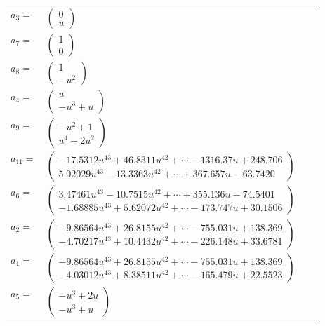 \documentclass[1p]{elsarticle_modified}
\theoremstyle{definition}
\begin{document}
\begin{tabular}{m{7pt} m{180pt} m{7pt} m{180pt} }
\flushright $a_{3}=$&$\begin{pmatrix}0\\u\end{pmatrix}$ \\
\flushright $a_{7}=$&$\begin{pmatrix}1\\0\end{pmatrix}$ \\
\flushright $a_{8}=$&$\begin{pmatrix}1\\- u^2\end{pmatrix}$ \\
\flushright $a_{4}=$&$\begin{pmatrix}u\\- u^3+u\end{pmatrix}$ \\
\flushright $a_{9}=$&$\begin{pmatrix}- u^2+1\\u^4-2 u^2\end{pmatrix}$ \\
\flushright $a_{11}=$&$\begin{pmatrix}-17.5312 u^{43}+46.8311 u^{42}+\cdots-1316.37 u+248.706\\5.02029 u^{43}-13.3363 u^{42}+\cdots+367.657 u-63.7420\end{pmatrix}$ \\
\flushright $a_{6}=$&$\begin{pmatrix}3.47461 u^{43}-10.7515 u^{42}+\cdots+355.136 u-74.5401\\-1.68885 u^{43}+5.62072 u^{42}+\cdots-173.747 u+30.1506\end{pmatrix}$ \\
\flushright $a_{2}=$&$\begin{pmatrix}-9.86564 u^{43}+26.8155 u^{42}+\cdots-755.031 u+138.369\\-4.70217 u^{43}+10.4432 u^{42}+\cdots-226.148 u+33.6781\end{pmatrix}$ \\
\flushright $a_{1}=$&$\begin{pmatrix}-9.86564 u^{43}+26.8155 u^{42}+\cdots-755.031 u+138.369\\-4.03012 u^{43}+8.38511 u^{42}+\cdots-165.479 u+22.5523\end{pmatrix}$ \\
\flushright $a_{5}=$&$\begin{pmatrix}- u^3+2 u\\- u^3+u\end{pmatrix}$ \\

\end{tabular}
\end{document}
